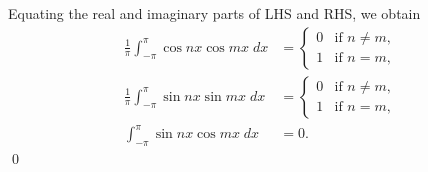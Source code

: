 \documentclass[oneside]{article}
\begin{document}
  Equating the real and imaginary parts of LHS and RHS, we obtain\begin{align*}
    \frac{1}{\pi}\int_{-\pi}^{\pi} \cos nx \cos mx\;dx &= \begin{cases}
      0 & \text{if }n \neq m \text{,} \\
      1 & \text{if }n = m \text{,}
    \end{cases} \\
    \frac{1}{\pi}\int_{-\pi}^{\pi} \sin nx \sin mx\;dx &= \begin{cases}
      0 & \text{if }n \neq m \text{,} \\
      1 & \text{if }n = m \text{,}
    \end{cases} \\
    \int_{-\pi}^{\pi} \sin nx \cos mx\;dx &= 0\text{.}
  \end{align*}\qed
\end{document}
